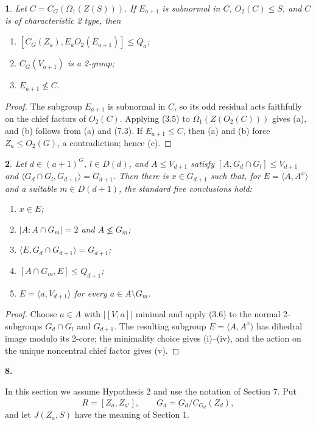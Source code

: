 \documentclass[11pt]{article}
\theoremstyle{plain}
\theoremstyle{stmplain}
\newtheorem{stm}{}[section]
\newcommand{\sect}[1]{\stepcounter{section}\par\vspace{14pt}%
  \begin{center}\textbf{#1.}\end{center}\vspace{2pt}}
\begin{document}
\begin{stm}\label{st:7.7}
Let $C=C_G(\Omega_1(Z(S)))$. If $E_{a+1}$ is subnormal in $C$,
$O_2(C)\le S$, and $C$ is of characteristic 2 type, then
\begin{enumerate}
\item[(a)] $[C_G(Z_a),E_aO_2(E_{a+1})]\le Q_a$;
\item[(b)] $C_G(V_{a+1})$ is a 2-group;
\item[(c)] $E_{a+1}\nleq C$.
\end{enumerate}
\end{stm}

\begin{proof}
The subgroup $E_{a+1}$ is subnormal in $C$, so its odd residual acts
faithfully on the chief factors of $O_2(C)$. Applying (3.5) to
$\Omega_1(Z(O_2(C)))$ gives (a), and (b) follows from (a) and (7.3).
If $E_{a+1}\le C$, then (a) and (b) force $Z_a\le O_2(G)$, a
contradiction; hence (c).
\end{proof}

\begin{stm}\label{st:7.8}
Let $d\in(a+1)^G$, $l\in D(d)$, and $A\le V_{d+1}$ satisfy
$[A,G_d\cap G_l]\le V_{d+1}$ and
$\langle G_d\cap G_l,G_{d+1}\rangle=G_{d+1}$. Then there is
$x\in G_{d+1}$ such that, for $E=\langle A,A^x\rangle$ and a suitable
$m\in D(d+1)$, the standard five conclusions hold:
\begin{enumerate}
\item[(i)] $x\in E$;
\item[(ii)] $|A:A\cap G_m|=2$ and $A\nleq G_m$;
\item[(iii)] $\langle E,G_d\cap G_{d+1}\rangle=G_{d+1}$;
\item[(iv)] $[A\cap G_m,E]\le Q_{d+1}$;
\item[(v)] $E=\langle a,V_{d+1}\rangle$ for every
  $a\in A\setminus G_m$.
\end{enumerate}
\end{stm}

\begin{proof}
Choose $a\in A$ with $|[V,a]|$ minimal and apply (3.6) to the
normal 2-subgroups $G_d\cap G_l$ and $G_{d+1}$. The resulting subgroup
$E=\langle A,A^x\rangle$ has dihedral image modulo its 2-core; the
minimality choice gives (i)--(iv), and the action on the unique noncentral
chief factor gives (v).
\end{proof}

\sect{8}

\noindent In this section we assume Hypothesis 2 and use the notation of
Section 7. Put
\[
 R=[Z_a,Z_{a'}],\qquad
 \overline G_d=G_d/C_{G_d}(Z_d),
\]
and let $J(Z_a,S)$ have the meaning of Section 1.
\end{document}
